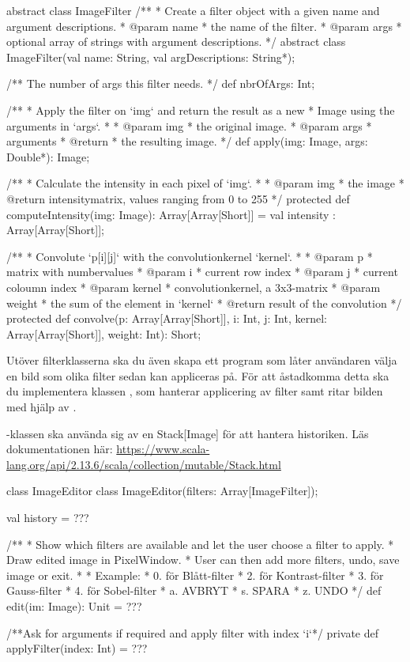 \begin{ScalaSpec}{abstract class ImageFilter}
/**
* Create a filter object with a given name and argument descriptions.
* @param name
*            the name of the filter.
* @param args
*            optional array of strings with argument descriptions.
*/
abstract class ImageFilter(val name: String, val argDescriptions: String*);

/**
The number of args this filter needs.
*/
def nbrOfArgs: Int;

/**
* Apply the filter on `img` and return the result as a new 
* Image using the arguments in `args`.
* 
* @param img
*            the original image.
* @param args
*            arguments
* @return 
*			 the resulting image.
*/
def apply(img: Image, args: Double*): Image;

/**
* Calculate the intensity in each pixel of `img`.
* 
* @param img
*           the image
* @return intensitymatrix, values ranging from 0 to 255
*/
protected def computeIntensity(img: Image): Array[Array[Short]] = 
   val intensity : Array[Array[Short]];

/**
* Convolute `p[i][j]` with the convolutionkernel `kernel`.
* 
* @param p
*            matrix with numbervalues
* @param i
*            current row index
* @param j
*            current coloumn index
* @param kernel
*            convolutionkernel, a 3x3-matrix
* @param weight
*            the sum of the element in `kernel`
* @return result of the convolution
*/
protected def convolve(p: Array[Array[Short]], i: Int, j: Int, 
kernel: Array[Array[Short]], weight: Int): Short;

\end{ScalaSpec}

Utöver filterklasserna ska du även skapa ett program som låter användaren välja en bild som olika filter sedan kan appliceras på.
För att åstadkomma detta ska du implementera klassen , som hanterar applicering av filter samt ritar bilden med hjälp av .



-klassen ska använda sig av en Stack[Image] för att hantera historiken. 
Läs dokumentationen här: \url{https://www.scala-lang.org/api/2.13.6/scala/collection/mutable/Stack.html}

\begin{ScalaSpec}{class ImageEditor}
class ImageEditor(filters: Array[ImageFilter]);

val history = ???

/** 
 * Show which filters are available and let the user choose a filter to apply. 
 * Draw edited image in PixelWindow.
 * User can then add more filters, undo, save image or exit.
 *  
 *  Example: 
 *  0. för Blått-filter
 *	2. för Kontrast-filter
 * 	3. för Gauss-filter
 *	4. för Sobel-filter
 *	a. AVBRYT
 *	s. SPARA
 *	z. UNDO
*/
def edit(im: Image): Unit = ???

/**Ask for arguments if required and apply filter with index `i`*/
private def applyFilter(index: Int) = ???
\end{ScalaSpec}

